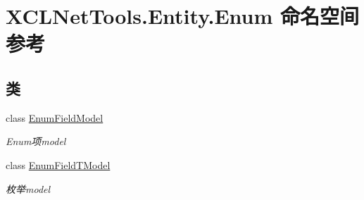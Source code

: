 \hypertarget{namespace_x_c_l_net_tools_1_1_entity_1_1_enum}{}\section{X\+C\+L\+Net\+Tools.\+Entity.\+Enum 命名空间参考}
\label{namespace_x_c_l_net_tools_1_1_entity_1_1_enum}
\subsection*{类}
\begin{DoxyCompactItemize}
\item 
class \hyperlink{class_x_c_l_net_tools_1_1_entity_1_1_enum_1_1_enum_field_model}{Enum\+Field\+Model}
\begin{DoxyCompactList}\small\item\em Enum项model \end{DoxyCompactList}\item 
class \hyperlink{class_x_c_l_net_tools_1_1_entity_1_1_enum_1_1_enum_field_t_model}{Enum\+Field\+T\+Model}
\begin{DoxyCompactList}\small\item\em 枚举model \end{DoxyCompactList}\end{DoxyCompactItemize}
